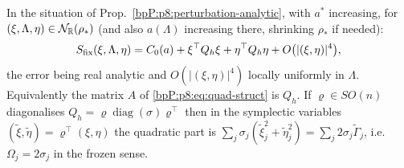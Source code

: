 \begin{theorem}\label{bpP:p8:quadratic-form}
In the situation of Prop.~\ref{bpP:p8:perturbation-analytic}, with $a^*$ increasing, for $(\xi,\Lambda,\eta)\in\mathcal N_{\mathbb{R}}(\rho_*)$ (and also $a(\Lambda)$ increasing there, shrinking $\rho_*$ if needed):
\[S_{\rm fix}(\xi,\Lambda,\eta)=C_0(a)+\xi^{\top}Q_h\xi+\eta^{\top}Q_h\eta+O\big(|(\xi,\eta)|^4\big),\]
the error being real analytic and $O(|(\xi,\eta)|^4)$ locally uniformly in $\Lambda$. Equivalently the matrix $A$ of \eqref{bpP:p8:eq:quad-struct} is $Q_h$. If $\varrho\in SO(n)$ diagonalises $Q_h=\varrho\operatorname{diag}(\sigma)\varrho^\top$ then in the symplectic variables $(\tilde\xi,\tilde\eta)=\varrho^\top(\xi,\eta)$ the quadratic part is $\sum_j\sigma_j(\tilde\xi_j^2+\tilde\eta_j^2)=\sum_j2\sigma_j\tilde\Gamma_j$, i.e.\ $\Omega_j=2\sigma_j$ in the frozen sense.
\end{theorem}
